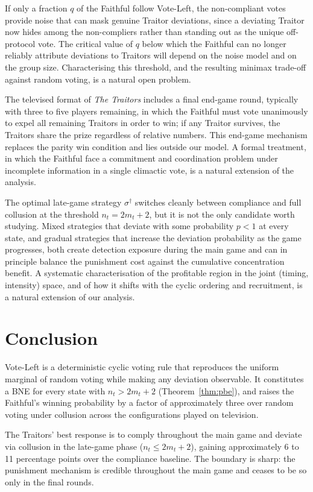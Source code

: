 \documentclass[11pt,a4paper]{article}
\begin{document}
If only a fraction \(q\) of the Faithful follow Vote-Left, the
non-compliant votes provide noise that can mask genuine Traitor
deviations, since a deviating Traitor now hides among the non-compliers
rather than standing out as the unique off-protocol vote. The critical
value of \(q\) below which the Faithful can no longer reliably attribute
deviations to Traitors will depend on the noise model and on the group
size. Characterising this threshold, and the resulting minimax
trade-off against random voting, is a natural open problem.

The televised format of \emph{The Traitors} includes a final end-game
round, typically with three to five players remaining, in which the
Faithful must vote unanimously to expel all remaining Traitors in order
to win; if any Traitor survives, the Traitors share the prize regardless
of relative numbers. This end-game mechanism replaces the parity win
condition and lies outside our model. A formal treatment, in which the
Faithful face a commitment and coordination problem under incomplete
information in a single climactic vote, is a natural extension of the
analysis.

The optimal late-game strategy \(\sigma^\dagger\) switches cleanly
between compliance and full collusion at the threshold \(n_t = 2m_t + 2\),
but it is not the only candidate worth studying. Mixed strategies that
deviate with some probability \(p < 1\) at every state, and gradual
strategies that increase the deviation probability as the game
progresses, both create detection exposure during the main game and can
in principle balance the punishment cost against the cumulative
concentration benefit. A systematic characterisation of the profitable
region in the joint (timing, intensity) space, and of how it shifts
with the cyclic ordering and recruitment, is a natural extension of our
analysis.

\section{Conclusion}

Vote-Left is a deterministic cyclic voting rule that reproduces the
uniform marginal of random voting while making any deviation observable.
It constitutes a BNE for every state with \(n_t > 2m_t + 2\)
(Theorem~\ref{thm:pbe}), and raises the Faithful's winning probability
by a factor of approximately three over random voting under collusion
across the configurations played on television.

The Traitors' best response is to comply throughout the main game and
deviate via collusion in the late-game phase (\(n_t \leq 2m_t + 2\)),
gaining approximately 6 to 11 percentage points over the compliance
baseline. The boundary is sharp: the punishment mechanism is credible
throughout the main game and ceases to be so only in the final rounds.
\end{document}
